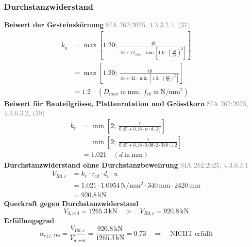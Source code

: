 \documentclass[11pt,a4paper]{article}
\newcommand{\normref}[1]{{\small\textcolor{gray}{#1}}}
\begin{document}
\subsubsection{Durchstanzwiderstand}
\noindent\textbf{Beiwert der Gesteinskörnung} \hfill \normref{SIA 262:2025, 4.3.3.2.1, (37)}
\begin{equation*}
\begin{aligned}
  k_g &= \max\left[1.20;\ \frac{48}{16 + D_{max} \cdot \min\left[1.0;\ \left(\frac{60}{f_{ck}}\right)^{2}\right]}\right] \\
  &= \max\left[1.20;\ \frac{48}{16 + 32 \cdot \min\left[1.0;\ \left(\frac{60}{30}\right)^{2}\right]}\right] \\
  &= 1.2 \quad \left(D_{max}\ \text{in}\ \mathrm{mm},\ f_{ck}\ \text{in}\ \mathrm{N}/\mathrm{mm}^{2}\right)
\end{aligned}
\end{equation*}
\noindent\textbf{Beiwert für Bauteilgrösse, Plattenrotation und Grösstkorn} \hfill \normref{SIA 262:2025, 4.3.6.3.2, (59)}
\begin{equation*}
\begin{aligned}
  k_r &= \min\left[2;\ \frac{1}{0.45 + 0.18 \cdot \psi \cdot d \cdot k_g}\right] \\
  &= \min\left[2;\ \frac{1}{0.45 + 0.18 \cdot 0.0072 \cdot 340 \cdot 1.2}\right] \\
  &= 1.021 \quad \left(d\ \text{in}\ \mathrm{mm}\right)
\end{aligned}
\end{equation*}
\noindent\textbf{Durchstanzwiderstand ohne Durchstanzbewehrung} \hfill \normref{SIA 262:2025, 4.3.6.3.1}
\begin{equation*}
\begin{aligned}
  V_{Rd,c} &= k_r \cdot \tau_{cd} \cdot d_v \cdot u \\
  &= 1.021 \cdot 1.0954\,\mathrm{N}/\mathrm{mm}^{2} \cdot 340\,\mathrm{mm} \cdot 2420\,\mathrm{mm} \\
  &= 920.8\,\mathrm{kN}
\end{aligned}
\end{equation*}
\noindent\textbf{Querkraft gegen Durchstanzwiderstand}
\begin{equation*}
V_{d,red} = 1265.3\,\mathrm{kN} \quad > \quad V_{Rd,c} = 920.8\,\mathrm{kN}
\end{equation*}
\noindent\textbf{Erfüllungsgrad}
\begin{equation*}
\alpha_{eff,DS} = \frac{V_{Rd,c}}{V_{d,red}} = \frac{920.8\,\mathrm{kN}}{1265.3\,\mathrm{kN}} = 0.73 \quad \Rightarrow \quad \text{NICHT erfüllt}
\end{equation*}
\end{document}

